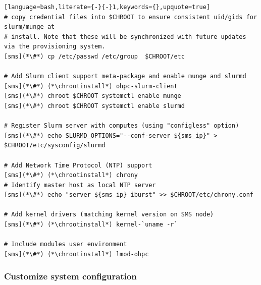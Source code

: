 \documentclass[letterpaper]{article}
\newcommand{\chrootinstall}{yum -y --installroot=\$CHROOT install}
\begin{document}
\begin{lstlisting}[language=bash,literate={-}{-}1,keywords={},upquote=true]
# copy credential files into $CHROOT to ensure consistent uid/gids for slurm/munge at
# install. Note that these will be synchronized with future updates via the provisioning system.
[sms](*\#*) cp /etc/passwd /etc/group  $CHROOT/etc

# Add Slurm client support meta-package and enable munge and slurmd
[sms](*\#*) (*\chrootinstall*) ohpc-slurm-client
[sms](*\#*) chroot $CHROOT systemctl enable munge
[sms](*\#*) chroot $CHROOT systemctl enable slurmd

# Register Slurm server with computes (using "configless" option)
[sms](*\#*) echo SLURMD_OPTIONS="--conf-server ${sms_ip}" > $CHROOT/etc/sysconfig/slurmd

# Add Network Time Protocol (NTP) support
[sms](*\#*) (*\chrootinstall*) chrony
# Identify master host as local NTP server
[sms](*\#*) echo "server ${sms_ip} iburst" >> $CHROOT/etc/chrony.conf

# Add kernel drivers (matching kernel version on SMS node)
[sms](*\#*) (*\chrootinstall*) kernel-`uname -r`

# Include modules user environment
[sms](*\#*) (*\chrootinstall*) lmod-ohpc
\end{lstlisting}

\vspace*{.2cm}
\subsubsection{Customize system configuration} \label{sec:master_customization}






\end{document}

